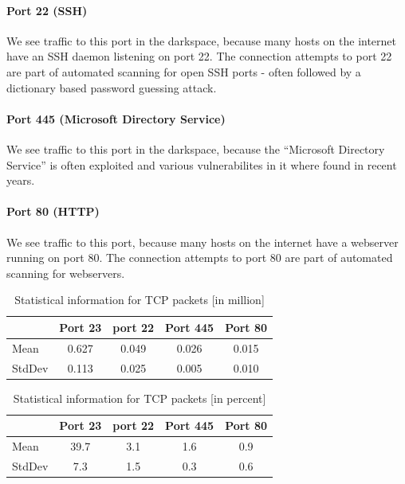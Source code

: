 \documentclass{article}
\begin{document}
\paragraph{Port 22 (SSH)}
We see traffic to this port in the darkspace, because many hosts on the internet have an
SSH daemon listening on port 22. The connection attempts to port 22 are part of automated scanning
for open SSH ports - often followed by a dictionary based password guessing attack.

\paragraph{Port 445 (Microsoft Directory Service)}
We see traffic to this port in the darkspace, because the ``Microsoft Directory Service'' is often
exploited and various vulnerabilites in it where found in recent years.

\paragraph{Port 80 (HTTP)}
We see traffic to this port, because many hosts on the internet have a webserver running
on port 80. The connection attempts to port 80 are part of automated scanning for webservers.

\begin{table}[H]
    \centering
    \begin{tabular}{l|cccc}
        & Port 23 & port 22 & Port  445 & Port 80 \\
        \hline
        Mean &  0.627 & 0.049 & 0.026 & 0.015 \\
        StdDev &  0.113 & 0.025 & 0.005 & 0.010 \\
    \end{tabular}
    \caption{\label{table:rep-19-absolute} Statistical information for TCP packets [in million]}
\end{table}

\begin{table}[H]
    \centering
    \begin{tabular}{l|cccc}
        & Port 23 & port 22 & Port  445 & Port 80 \\
        \hline
        Mean &   39.7 & 3.1 & 1.6 & 0.9  \\
        StdDev & 7.3  & 1.5 & 0.3 & 0.6   \\
    \end{tabular}
    \caption{\label{table:rep-19-percentage} Statistical information for TCP packets [in percent]}
\end{table}
\end{document}
